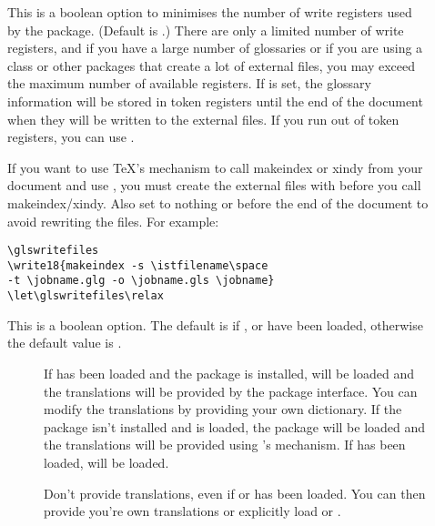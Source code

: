 \documentclass[report]{nlctdoc}
\begin{document}
\begin{description}
\item[] This is a boolean option to minimises the
number of write registers used by the  package.
(Default is .) There are only a limited
number of write registers, and if you have a large number of
glossaries or if you are using a class or other packages that
create a lot of external files, you may exceed the maximum number
of available registers. If  is set, the glossary
information will be stored in token registers until the end of the
document when they will be written to the external files. If you run
out of token registers, you can use .

\begin{important}
If you want to use \TeX's  mechanism to call
\gls{makeindex} or \gls{xindy} from your document and use
, you must create the external files with 
 before you call \gls*{makeindex}/\gls*{xindy}. Also set
 to nothing or  before the end of the
document to avoid rewriting the files. For example:
\begin{verbatim}
\glswritefiles
\write18{makeindex -s \istfilename\space 
-t \jobname.glg -o \jobname.gls \jobname}
\let\glswritefiles\relax
\end{verbatim}
\end{important}

\item[] This is a boolean option. The default is
 if ,  or 
 have been loaded, otherwise the default value is
.

  \begin{description}
  \item[{}] If  has been loaded
  and the  package is installed, 
  will be loaded and the translations will be provided by the
   package interface. You can modify the 
  translations by providing your own dictionary. If the 
   package isn't installed and  is
  loaded, the  package will 
  be loaded and the translations will be provided using 's
   mechanism. If 
   has been loaded, 
  will be loaded.

  \item[{}] Don't provide translations, even
  if  or  has been loaded. You can 
  then provide you're own translations or explicitly load 
   or .
  \end{description}


\end{description}
\end{document}
